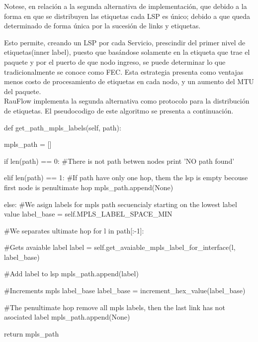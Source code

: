 Notese, en relación a la segunda alternativa de implementaci\'on, que debido a la forma en que se distribuyen las etiquetas cada LSP es único; debido a que queda determinado de forma única por la sucesión de links y etiquetas. 

Esto permite, creando un LSP por cada Servicio, prescindir del primer nivel de etiquetas(inner label), puesto que basándose solamente en la etiqueta que trae el paquete y por el puerto de que nodo ingreso, se puede determinar lo que tradicionalmente se conoce como FEC. Esta estrategia presenta como ventajas menos costo de procesamiento de etiquetas en cada nodo, y un aumento del MTU del paquete.\\

RauFlow implementa la segunda alternativa como protocolo para la distribución de etiquetas. El pseudocodigo de este algoritmo se presenta a continuación.\\

\begin{python}
def get_path_mpls_labels(self, path):

    mpls_path = []

    if len(path) == 0:
        #There is not path betwen nodes
        print 'NO path found'

    elif len(path) == 1:
        #If path have only one hop, them the lsp is empty becouse first node is penultimate hop
        mpls_path.append(None)
        
    else:
        #We asign labels for mpls path secuencialy starting on the lowest label value
        label_base = self.MPLS_LABEL_SPACE_MIN
        
        #We separates ultimate hop
        for l in path[:-1]:
        	       
           	#Gets avaiable label
           	label = self.get_avaiable_mpls_label_for_interface(l, label_base)

          	#Add label to lsp
           	mpls_path.append(label)

           	#Increments mpls label_base
            label_base = increment_hex_value(label_base)

            #The penultimate hop remove all mpls labels, then the last link has not asociated label
            mpls_path.append(None)

    return mpls_path
\end{python}

